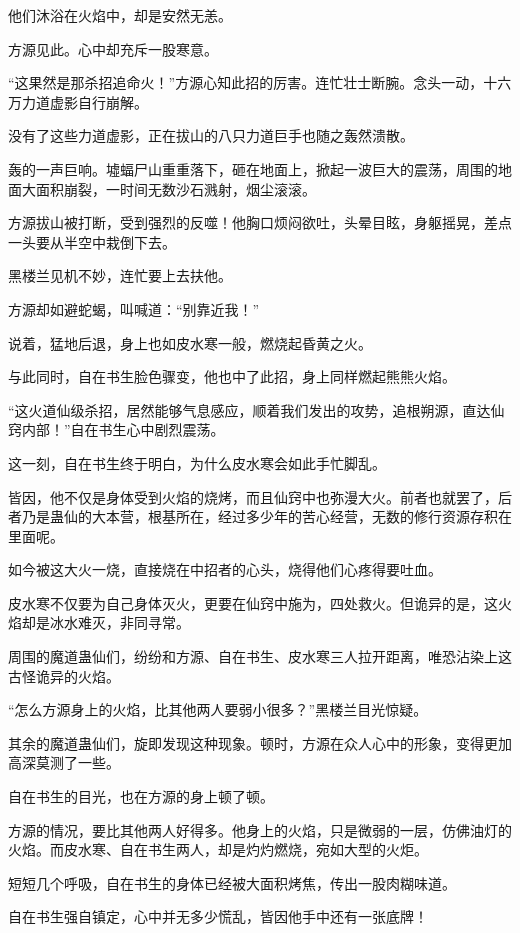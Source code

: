 \begin{this_body}
他们沐浴在火焰中，却是安然无恙。

方源见此。心中却充斥一股寒意。

“这果然是那杀招追命火！”方源心知此招的厉害。连忙壮士断腕。念头一动，十六万力道虚影自行崩解。

没有了这些力道虚影，正在拔山的八只力道巨手也随之轰然溃散。

轰的一声巨响。墟蝠尸山重重落下，砸在地面上，掀起一波巨大的震荡，周围的地面大面积崩裂，一时间无数沙石溅射，烟尘滚滚。

方源拔山被打断，受到强烈的反噬！他胸口烦闷欲吐，头晕目眩，身躯摇晃，差点一头要从半空中栽倒下去。

黑楼兰见机不妙，连忙要上去扶他。

方源却如避蛇蝎，叫喊道：“别靠近我！”

说着，猛地后退，身上也如皮水寒一般，燃烧起昏黄之火。

与此同时，自在书生脸色骤变，他也中了此招，身上同样燃起熊熊火焰。

“这火道仙级杀招，居然能够气息感应，顺着我们发出的攻势，追根朔源，直达仙窍内部！”自在书生心中剧烈震荡。

这一刻，自在书生终于明白，为什么皮水寒会如此手忙脚乱。

皆因，他不仅是身体受到火焰的烧烤，而且仙窍中也弥漫大火。前者也就罢了，后者乃是蛊仙的大本营，根基所在，经过多少年的苦心经营，无数的修行资源存积在里面呢。

如今被这大火一烧，直接烧在中招者的心头，烧得他们心疼得要吐血。

皮水寒不仅要为自己身体灭火，更要在仙窍中施为，四处救火。但诡异的是，这火焰却是冰水难灭，非同寻常。

周围的魔道蛊仙们，纷纷和方源、自在书生、皮水寒三人拉开距离，唯恐沾染上这古怪诡异的火焰。

“怎么方源身上的火焰，比其他两人要弱小很多？”黑楼兰目光惊疑。

其余的魔道蛊仙们，旋即发现这种现象。顿时，方源在众人心中的形象，变得更加高深莫测了一些。

自在书生的目光，也在方源的身上顿了顿。

方源的情况，要比其他两人好得多。他身上的火焰，只是微弱的一层，仿佛油灯的火焰。而皮水寒、自在书生两人，却是灼灼燃烧，宛如大型的火炬。

短短几个呼吸，自在书生的身体已经被大面积烤焦，传出一股肉糊味道。

自在书生强自镇定，心中并无多少慌乱，皆因他手中还有一张底牌！


\end{this_body}
